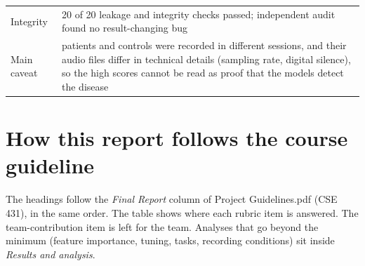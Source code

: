 \documentclass[11pt,a4paper]{article}
\begin{document}
\begin{center}
\begin{longtable}{>{\raggedright\arraybackslash}p{3.17cm}>{\raggedright\arraybackslash}p{12.49cm}}
\hspace{0pt}Integrity & \hspace{0pt}20 of 20 leakage and integrity checks passed; independent audit found no result-changing bug\\
\hspace{0pt}Main caveat & \hspace{0pt}patients and controls were recorded in different sessions, and their audio files differ in technical details (sampling rate, digital silence), so the high scores cannot be read as proof that the models detect the disease\\
\end{longtable}\end{center}
\section*{How this report follows the course guideline}
The headings follow the \emph{Final Report} column of Project Guidelines.pdf (CSE 431), in the same order. The table shows where each rubric item is answered. The team-contribution item is left for the team. Analyses that go beyond the minimum (feature importance, tuning, tasks, recording conditions) sit inside \emph{Results and analysis}.
\end{document}
